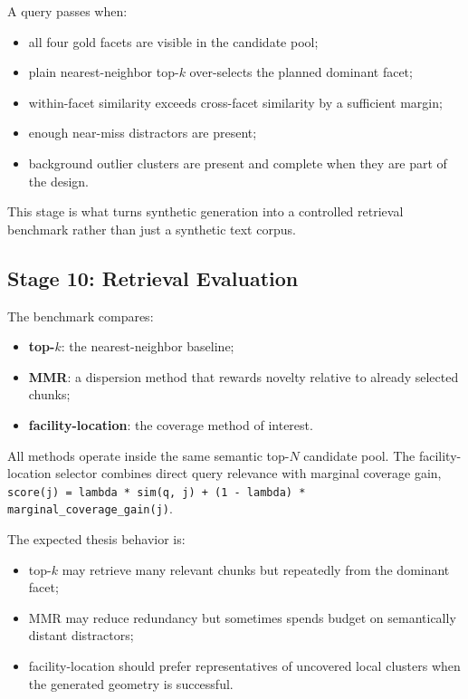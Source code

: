 \documentclass[11pt,a4paper]{article}
\newcommand{\field}[1]{\texttt{#1}}
\newcommand{\stage}[2]{\subsection{\textcolor{betterblue}{#1}: #2}}
\begin{document}
A query passes when:

\begin{itemize}[noitemsep, topsep=0pt]
	\item all four gold facets are visible in the candidate pool;
	\item plain nearest-neighbor top-$k$ over-selects the planned dominant facet;
	\item within-facet similarity exceeds cross-facet similarity by a sufficient margin;
	\item enough near-miss distractors are present;
	\item background outlier clusters are present and complete when they are part of the design.
\end{itemize}

This stage is what turns synthetic generation into a controlled retrieval benchmark rather than just a synthetic text corpus.

\stage{Stage 10}{Retrieval Evaluation}

The benchmark compares:

\begin{itemize}[noitemsep, topsep=0pt]
	\item \textbf{top-$k$}: the nearest-neighbor baseline;
	\item \textbf{MMR}: a dispersion method that rewards novelty relative to already selected chunks;
	\item \textbf{facility-location}: the coverage method of interest.
\end{itemize}

All methods operate inside the same semantic top-$N$ candidate pool. The facility-location selector combines direct query relevance with marginal coverage gain, \field{score(j) = lambda * sim(q, j) + (1 - lambda) * marginal\_coverage\_gain(j)}.

The expected thesis behavior is:

\begin{itemize}[noitemsep, topsep=0pt]
	\item top-$k$ may retrieve many relevant chunks but repeatedly from the dominant facet;
	\item MMR may reduce redundancy but sometimes spends budget on semantically distant distractors;
	\item facility-location should prefer representatives of uncovered local clusters when the generated geometry is successful.
\end{itemize}
\end{document}
